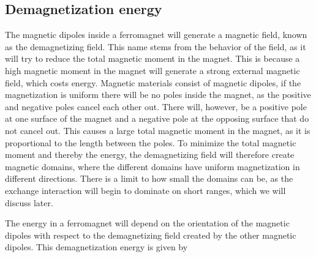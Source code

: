 \documentclass[12pt, a4paper, twoside, openright]{article}		%
\numberwithin{equation}{section}
\begin{document}
\subsection{Demagnetization energy}
The magnetic dipoles inside a ferromagnet will generate a magnetic field, known as the demagnetizing field. This name stems from the behavior of the field, as it will try to reduce the total magnetic moment in the magnet. This is because a high magnetic moment in the magnet will generate a strong external magnetic field, which costs energy. Magnetic materials consist of magnetic dipoles, if the magnetization is uniform there will be no poles inside the magnet, as the positive and negative poles cancel each other out. There will, however, be a positive pole at one surface of the magnet and a negative pole at the opposing surface that do not cancel out. This causes a large total magnetic moment in the magnet, as it is proportional to the length between the poles. To minimize the total magnetic moment and thereby the energy, the demagnetizing field will therefore create magnetic domains, where the different domains have uniform magnetization in different directions. There is a limit to how small the domains can be, as the exchange interaction will begin to dominate on short ranges, which we will discuss later. 

The energy in a ferromagnet will depend on the orientation of the magnetic dipoles with respect to the demagnetizing field created by the other magnetic dipoles. This demagnetization energy is given by
\end{document}
